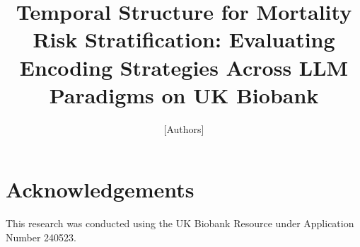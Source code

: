 \documentclass[runningheads]{llncs}
\begin{document}
\title{Temporal Structure for Mortality Risk Stratification: Evaluating
       Encoding Strategies Across LLM Paradigms on UK Biobank}
\authorrunning{[Authors]}

\author{[Authors]}
\institute{[Institution]}
\maketitle









\section*{Acknowledgements}
This research was conducted using the UK Biobank Resource under
Application Number 240523.



\end{document}
